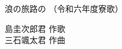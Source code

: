\documentclass[10pt,b5j]{tarticle} %
\begin{document}
\begin{minipage}[c]{0.7\hsize} %
    \begin{center}
        {\LARGE
            浪の旅路の %
        }
        {\small 
            （令和六年度寮歌） %
        }
    \end{center}
\end{minipage}
\begin{minipage}[c]{0.3\hsize} %
    \begin{flushright} %
        島圭次郎君 作歌\\三石颯太君 作曲 %
    \end{flushright}
\end{minipage}
\end{document}
